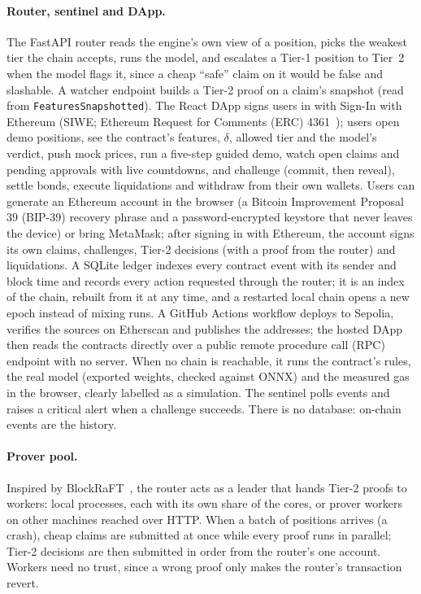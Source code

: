 \documentclass[sigconf,nonacm]{acmart}
\newcommand{\code}[1]{\texttt{\smaller #1}}
\begin{document}
\paragraph{Router, sentinel and DApp.} The FastAPI router reads the engine's own view of a position, picks the weakest tier the chain accepts, runs the model, and escalates a Tier-1 position to Tier~2 when the model flags it, since a cheap ``safe'' claim on it would be false and slashable. A watcher endpoint builds a Tier-2 proof on a claim's snapshot (read from \code{FeaturesSnapshotted}). The React DApp signs users in with Sign-In with Ethereum (SIWE; Ethereum Request for Comments (ERC) 4361~\cite{eip4361}); users open demo positions, see the contract's features, $\delta$, allowed tier and the model's verdict, push mock prices, run a five-step guided demo, watch open claims and pending approvals with live countdowns, and challenge (commit, then reveal), settle bonds, execute liquidations and withdraw from their own wallets. Users can generate an Ethereum account in the browser (a Bitcoin Improvement Proposal 39 (BIP-39) recovery phrase and a password-encrypted keystore that never leaves the device) or bring MetaMask; after signing in with Ethereum, the account signs its own claims, challenges, Tier-2 decisions (with a proof from the router) and liquidations. A SQLite ledger indexes every contract event with its sender and block time and records every action requested through the router; it is an index of the chain, rebuilt from it at any time, and a restarted local chain opens a new epoch instead of mixing runs. A GitHub Actions workflow deploys to Sepolia, verifies the sources on Etherscan and publishes the addresses; the hosted DApp then reads the contracts directly over a public remote procedure call (RPC) endpoint with no server. When no chain is reachable, it runs the contract's rules, the real model (exported weights, checked against ONNX) and the measured gas in the browser, clearly labelled as a simulation. The sentinel polls events and raises a critical alert when a challenge succeeds. There is no database: on-chain events are the history.

\paragraph{Prover pool.} Inspired by BlockRaFT~\cite{piduguralla2026blockraft}, the router acts as a leader that hands Tier-2 proofs to workers: local processes, each with its own share of the cores, or prover workers on other machines reached over HTTP. When a batch of positions arrives (a crash), cheap claims are submitted at once while every proof runs in parallel; Tier-2 decisions are then submitted in order from the router's one account. Workers need no trust, since a wrong proof only makes the router's transaction revert.
\end{document}
